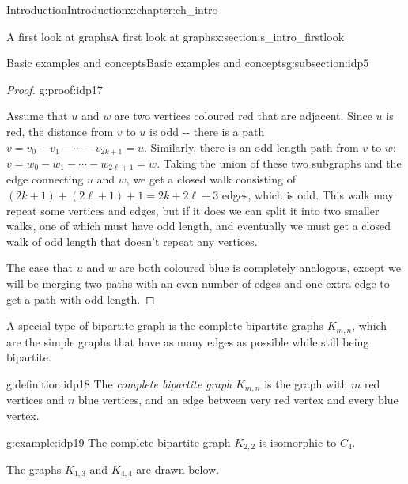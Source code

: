 \documentclass[oneside,10pt,]{book}
\numberwithin{equation}{section}
\begin{document}
\begin{chapterptx}{Introduction}{}{Introduction}{}{}{x:chapter:ch_intro}
\begin{sectionptx}{A first look at graphs}{}{A first look at graphs}{}{}{x:section:s_intro_firstlook}
\begin{subsectionptx}{Basic examples and concepts}{}{Basic examples and concepts}{}{}{g:subsection:idp5}
\begin{proof}{}{g:proof:idp17}
\par
Assume that \(u\) and \(w\) are two vertices coloured red that are adjacent.  Since \(u\) is red, the distance from \(v\) to \(u\) is odd -{}-{} there is a path \(v=v_0 - v_1 - \cdots - v_{2k+1}=u\).  Similarly, there is an odd length path from \(v\) to \(w\): \(v=w_0 - w_1 - \cdots - w_{2\ell+1}=w\).  Taking the union of these two subgraphs and the edge connecting \(u\) and \(w\), we get a closed walk consisting of \((2k+1)+(2\ell+1)+1=2k+2\ell+3\) edges, which is odd.  This walk may repeat some vertices and edges, but if it does we can split it into two smaller walks, one of which must have odd length, and eventually we must get a closed walk of odd length that doesn't repeat any vertices.%
\par
The case that \(u\) and \(w\) are both coloured blue is completely analogous, except we will be merging two paths with an even number of edges and one extra edge to get a path with odd length.%
\end{proof}
A special type of bipartite graph is the complete bipartite graphs \(K_{m,n}\), which are the simple graphs that have as many edges as possible while still being bipartite.%
\begin{definition}{}{g:definition:idp18}%
The \emph{complete bipartite graph} \(K_{m,n}\) is the graph with \(m\) red vertices and \(n\) blue vertices, and an edge between very red vertex and every blue vertex.%
\end{definition}
\begin{example}{}{g:example:idp19}%
The complete bipartite graph \(K_{2,2}\) is isomorphic to \(C_4\).%
\par
The graphs \(K_{1,3}\) and \(K_{4,4}\) are drawn below.%
\begin{image}{0.05}{0.9}{0.05}%
\end{image}
\end{example}
\end{subsectionptx}
\end{sectionptx}
\end{chapterptx}
\end{document}
